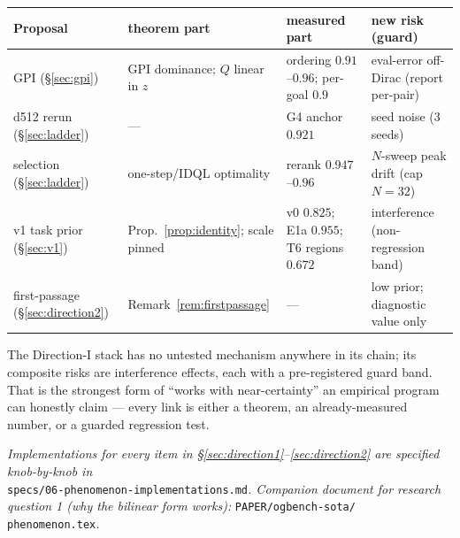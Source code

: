 \documentclass[11pt]{article}
\theoremstyle{definition}
\theoremstyle{remark}
\begin{document}
\begin{center}\footnotesize
\renewcommand{\arraystretch}{1.2}
\setlength{\tabcolsep}{3.5pt}
\begin{tabular}{@{}l p{3.4cm} p{3.6cm} p{3.9cm}@{}}
\toprule
Proposal & theorem part & measured part & new risk (guard) \\
\midrule
GPI (\S\ref{sec:gpi}) & GPI dominance; $Q$ linear in $z$ &
ordering $0.91$--$0.96$; per-goal $0.9$ & eval-error off-Dirac (report per-pair) \\
d512 rerun (\S\ref{sec:ladder}) & --- & G4 anchor $0.921$ & seed noise (3 seeds) \\
selection (\S\ref{sec:ladder}) & one-step/IDQL optimality & rerank $0.947$--$0.96$ &
$N$-sweep peak drift (cap $N{=}32$) \\
v1 task prior (\S\ref{sec:v1}) & Prop.~\ref{prop:identity}; scale pinned &
v0 $0.825$; E1a $0.955$; T6 regions $0.672$ & interference (non-regression band) \\
first-passage (\S\ref{sec:direction2}) & Remark~\ref{rem:firstpassage} & --- & low prior;
diagnostic value only \\
\bottomrule
\end{tabular}
\end{center}

\noindent The Direction-I stack has no untested mechanism anywhere in its chain; its
composite risks are interference effects, each with a pre-registered guard band. That is the
strongest form of ``works with near-certainty'' an empirical program can honestly claim ---
every link is either a theorem, an already-measured number, or a guarded regression test.

\medskip
\noindent\emph{Implementations for every item in \S\ref{sec:direction1}--\ref{sec:direction2}
are specified knob-by-knob in}\\
\texttt{specs/06-phenomenon-implementations.md}\emph{. Companion document for research
question 1 (why the bilinear form works):} \texttt{PAPER/ogbench-sota/}\\
\texttt{phenomenon.tex}\emph{.}
\end{document}

